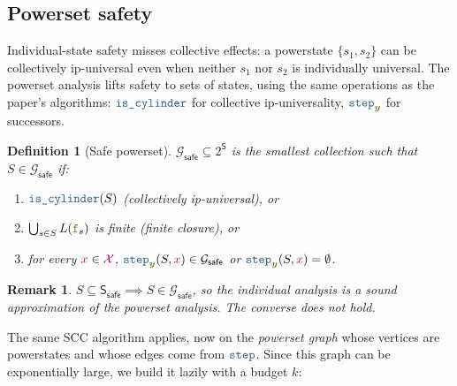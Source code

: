 \documentclass{article}
\newcommand{\mymacro}[1]{#1}
\newcommand{\srcSym}{{\color{TokenColor}x}}
\newcommand{\tgtStr}{{\color{CharacterColor}\boldsymbol{y}}}
\newcommand{\srcAlphabet}[0]{{\color{TokenColor}\ensuremath{\mathcal{X}}}\xspace}
\newcommand{\transST}{{\color{CharacterColor}\texttt{f}}}
\newcommand{\States}{\mymacro{\mathsf{S}}}
\newcommand{\state}{\mymacro{s}}
\newcommand{\powerstate}{S}
\newcommand{\isCylinder}{\mbox{\texttt{{\color{StormBlue}is\_cylinder}}}}
\newcommand{\step}{\mbox{\texttt{{\color{StormBlue}step}}}}
\newcommand{\SafeStates}{\States_{\mathsf{safe}}}
\newcommand{\SafePower}{\mathcal{G}_{\mathsf{safe}}}
\theoremstyle{plain}
\newtheorem{definition}[theorem]{Definition}
\newtheorem{remark}[theorem]{Remark}
\begin{document}
\subsection{Powerset safety}
\label{sec:level2}

Individual-state safety misses collective effects: a powerstate
$\{\state_1, \state_2\}$ can be collectively ip-universal even when neither
$\state_1$ nor $\state_2$ is individually universal.
The powerset analysis lifts safety to sets of states, using the same operations
as the paper's algorithms: $\isCylinder$ for collective ip-universality,
$\step_{\tgtStr}$ for successors.

\begin{definition}[Safe powerset]
\label{def:safe-powerset}
$\SafePower \subseteq 2^{\States}$ is the smallest collection such that $\powerstate \in \SafePower$ if:
\begin{enumerate}[label=(\alph*)]
\item $\isCylinder(\powerstate)$
  \quad (collectively ip-universal), or
\item $\bigcup_{\state \in \powerstate} L(\transST_\state)$ is finite
  \quad (finite closure), or
\item for every $\srcSym \in \srcAlphabet$,\;
  $\step_{\tgtStr}(\powerstate, \srcSym) \in \SafePower$ or
  $\step_{\tgtStr}(\powerstate, \srcSym) = \emptyset$.
\end{enumerate}
\end{definition}

\begin{remark}
\label{rem:levels}
$\powerstate \subseteq \SafeStates \implies \powerstate \in \SafePower$,
so the individual analysis is a sound approximation of the powerset analysis.
The converse does not hold.
\end{remark}

The same SCC algorithm applies, now on the \emph{powerset graph} whose
vertices are powerstates and whose edges come from $\step$.  Since this graph
can be exponentially large, we build it lazily with a budget $k$:
\end{document}
